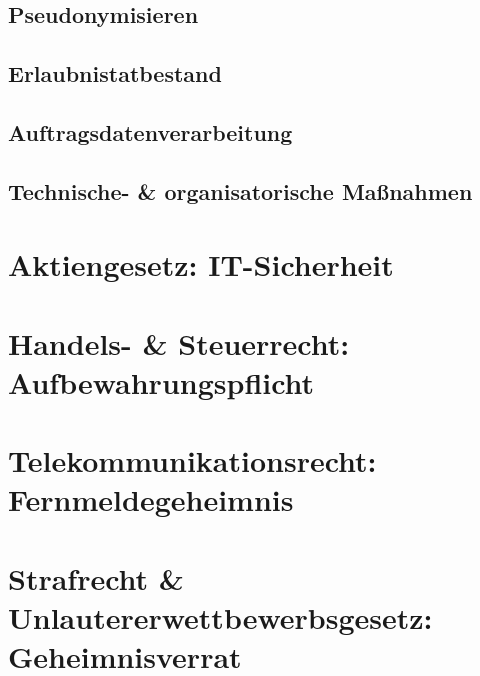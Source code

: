 \subsection{Pseudonymisieren}
 \label{pseudonymisieren}
\subsection{Erlaubnistatbestand}
 \label{erlaubnistatbestand}
\subsection{Auftragsdatenverarbeitung}
 \label{auftragsdatenverarbeitung}
\subsection{Technische- \& organisatorische Ma{\ss}nahmen}
 \label{technische_u_organisatorische_massnahmen}
\section{Aktiengesetz: IT-Sicherheit}
 \label{aktiengesetz_it_sicherheit}
\section{Handels- \& Steuerrecht: Aufbewahrungspflicht}
 \label{handels_u_steuerrecht_aufbewahrungspflicht}
\section{Telekommunikationsrecht: Fernmeldegeheimnis}
 \label{telekommunikationsrecht_fernmeldegeheimnis}
\section{Strafrecht \& Unlautererwettbewerbsgesetz: Geheimnisverrat}
 \label{strafrecht_u_unlautererwettbewerbsgesetz_geheimnisverrat}

  